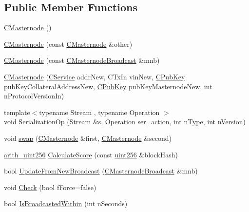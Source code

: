 \subsection*{Public Member Functions}
\begin{DoxyCompactItemize}
\item 
\mbox{\hyperlink{class_c_masternode_a9783a33543d5d7b5f7101f3196562276}{C\+Masternode}} ()
\item 
\mbox{\hyperlink{class_c_masternode_a45ddf472ea17b5393060b648a1e25291}{C\+Masternode}} (const \mbox{\hyperlink{class_c_masternode}{C\+Masternode}} \&other)
\item 
\mbox{\hyperlink{class_c_masternode_a627dbc7dfeaa9a996bcf7fac3665933b}{C\+Masternode}} (const \mbox{\hyperlink{class_c_masternode_broadcast}{C\+Masternode\+Broadcast}} \&mnb)
\item 
\mbox{\hyperlink{class_c_masternode_ae11e8917ed00c7cee11dc5fdb211ecb1}{C\+Masternode}} (\mbox{\hyperlink{class_c_service}{C\+Service}} addr\+New, C\+Tx\+In vin\+New, \mbox{\hyperlink{class_c_pub_key}{C\+Pub\+Key}} pub\+Key\+Collateral\+Address\+New, \mbox{\hyperlink{class_c_pub_key}{C\+Pub\+Key}} pub\+Key\+Masternode\+New, int n\+Protocol\+Version\+In)
\item 
{\footnotesize template$<$typename Stream , typename Operation $>$ }\\void \mbox{\hyperlink{class_c_masternode_ac3514c93cc494ae196dc217df847950d}{Serialization\+Op}} (Stream \&s, Operation ser\+\_\+action, int n\+Type, int n\+Version)
\item 
void \mbox{\hyperlink{class_c_masternode_a8cad9a9fa0b7afe75ba20254d7790b61}{swap}} (\mbox{\hyperlink{class_c_masternode}{C\+Masternode}} \&first, \mbox{\hyperlink{class_c_masternode}{C\+Masternode}} \&second)
\item 
\mbox{\hyperlink{classarith__uint256}{arith\+\_\+uint256}} \mbox{\hyperlink{class_c_masternode_abfee4bc30fa436d9a5f8b5f15a078081}{Calculate\+Score}} (const \mbox{\hyperlink{classuint256}{uint256}} \&block\+Hash)
\item 
bool \mbox{\hyperlink{class_c_masternode_a96da6f523ec3a160239c966bf0dcf876}{Update\+From\+New\+Broadcast}} (\mbox{\hyperlink{class_c_masternode_broadcast}{C\+Masternode\+Broadcast}} \&mnb)
\item 
void \mbox{\hyperlink{class_c_masternode_ac00056a0de9176ec7922d88795a6988f}{Check}} (bool f\+Force=false)
\item 
bool \mbox{\hyperlink{class_c_masternode_aa9aecc4762dcb9f6a5a5fb359e5aa9e1}{Is\+Broadcasted\+Within}} (int n\+Seconds)

\end{DoxyCompactItemize}
